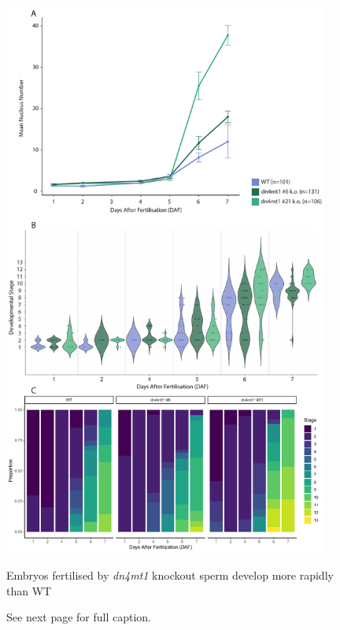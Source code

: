 \begin{figure}[htbp!] 
\centering    
    \includegraphics[width=0.95\textwidth]{Chapter3/Figs/Figure11_nucleus_number.pdf}
    \captionsetup{belowskip=0pt, aboveskip=0pt}
    \caption{Embryos fertilised by \textit{dn4mt1} knockout sperm develop more rapidly than WT}
    \label{fig:nucleus_number}
    \caption*{See next page for full caption.}
\end{figure}

\clearpage 

\FloatBarrier  %

